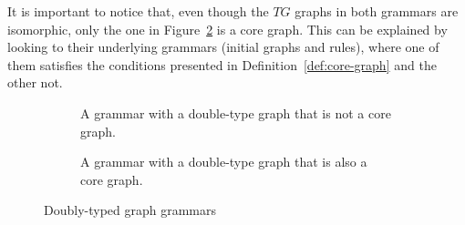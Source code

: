 \begin{example}
  It is important to notice that, even though the $TG$ graphs in both grammars are isomorphic, only the one in Figure~\ref{fig:process:core-graph:example} is a core graph. This can be explained by looking to their underlying grammars (initial graphs and rules), where one of them satisfies the conditions presented in Definition~\ref{def:core-graph} and the other not.
\begin{figure}[!ht]
  \centering
  \begin{subfigure}[t]{.5\textwidth}
    \centerline{}
    \caption{A grammar with a double-type graph that is not a core graph.}\label{fig:process:core-graph:counter-example}
  \end{subfigure}
  \begin{subfigure}[t]{.5\textwidth}
    \centerline{}
    \caption{A grammar with a double-type graph that is also a core graph.}\label{fig:process:core-graph:example}
  \end{subfigure}

  \caption{Doubly-typed graph grammars}\label{fig:process:doubly-typed-grammars}
\end{figure}

\end{example}

